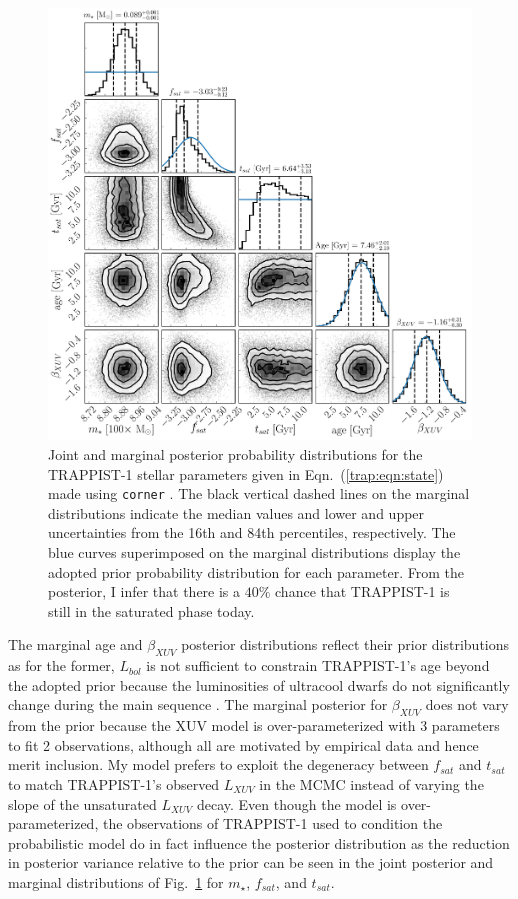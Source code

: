 \begin{figure}
\centering
	\includegraphics[width=\textwidth]{trappist1Corner.pdf}
   \caption{Joint and marginal posterior probability distributions for the TRAPPIST-1 stellar parameters given in Eqn.~(\ref{trap:eqn:state}) made using \texttt{corner} \citep{ForemanMackey2016}. The black vertical dashed lines on the marginal distributions indicate the median values and lower and upper uncertainties from the 16th and 84th percentiles, respectively. The blue curves superimposed on the marginal distributions display the adopted prior probability distribution for each parameter. From the posterior, I infer that there is a $40\%$ chance that TRAPPIST-1 is still in the saturated phase today.}%
    \label{trap:fig:corner}%
\end{figure}

The marginal age and $\beta_{XUV}$ posterior distributions reflect their prior distributions as for the former, $L_{bol}$ is not sufficient to constrain TRAPPIST-1's age beyond the adopted prior because the luminosities of ultracool dwarfs do not significantly change during the main sequence \citep{Baraffe2015}. The marginal posterior for $\beta_{XUV}$ does not vary from the prior because the XUV model is over-parameterized with 3 parameters to fit 2 observations, although all are motivated by empirical data and hence merit inclusion. My model prefers to exploit the degeneracy between $f_{sat}$ and $t_{sat}$ to match TRAPPIST-1's observed $L_{XUV}$ in the MCMC instead of varying the slope of the unsaturated $L_{XUV}$ decay. Even though the model is over-parameterized, the observations of TRAPPIST-1 used to condition the probabilistic model do in fact influence the posterior distribution as the reduction in posterior variance relative to the prior can be seen in the joint posterior and marginal distributions of Fig.~\ref{trap:fig:corner} for $m_{\star}$, $f_{sat}$, and $t_{sat}$.

